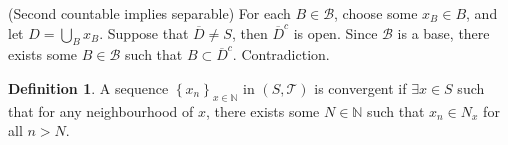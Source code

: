 \documentclass[11pt]{article}
\theoremstyle{definition}
\newtheorem{defn}{Definition}[section]
\newcommand{\set}[1]{\left\{ #1 \right\}}
\newcommand{\NN}{\mathbb{N}}
\newcommand{\m}[1]{\mathcal{#1}}
\begin{document}
(Second countable implies separable)
For each $B\in\m{B}$, choose some $x_B\in B$, and let $D=\bigcup_B x_B$. Suppose that
$\overline{D}\neq S$, then $\overline{D}^c$ is open. Since $\m{B}$ is a base, there exists
some $B\in\m{B}$ such that $B\subset\overline{D}^c$. Contradiction.
\qedhere

\begin{defn}
A sequence $\set{x_n}_{x\in\NN}$ in $(S,\m{T})$ is convergent if $\exists x\in S$ such that
for any neighbourhood of $x$, there exists some $N\in\NN$ such that $x_n\in N_x$ for all
$n>N$.
\end{defn}


\end{document}
